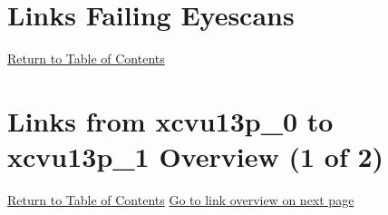 \documentclass{report}
\newcounter{nextpage}
\begin{document}





\chapter{Links Failing Eyescans}
\hyperlink{MyToc}{Return to Table of Contents} \newline \newline

\chapter{Links from xcvu13p\_0 to xcvu13p\_1 Overview (1 of 2)}
\hyperlink{MyToc}{Return to Table of Contents} \newline \newline
\setcounter{nextpage}{\thepage}
\hyperlink{page.\the\value{nextpage}}{Go to link overview on next page} \newpage
\end{document}
